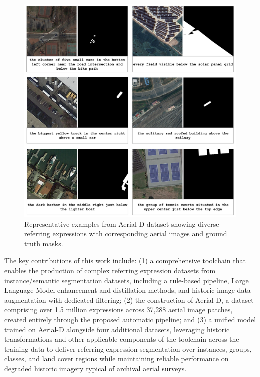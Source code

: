 \begingroup
\setlength{\intextsep}{6pt}
\setlength{\abovecaptionskip}{2pt}
\setlength{\belowcaptionskip}{0pt}
\begin{figure}[H]
\centering
\includegraphics[width=\columnwidth]{./images/6samples.png}
\caption{Representative examples from Aerial-D dataset showing diverse referring expressions with corresponding aerial images and ground truth masks.}
\label{fig:dataset_examples}
\end{figure}
\endgroup


The key contributions of this work include: (1) a comprehensive toolchain that enables the production of complex referring expression datasets from instance/semantic segmentation datasets, including a rule-based pipeline, Large Language Model enhancement and distillation methods, and historic image data augmentation with dedicated filtering; (2) the construction of Aerial-D, a dataset comprising over 1.5 million expressions across 37,288 aerial image patches, created entirely through the proposed automatic pipeline; and (3) a unified model trained on Aerial-D alongside four additional datasets, leveraging historic transformations and other applicable components of the toolchain across the training data to deliver referring expression segmentation over instances, groups, classes, and land cover regions while maintaining reliable performance on degraded historic imagery typical of archival aerial surveys.
